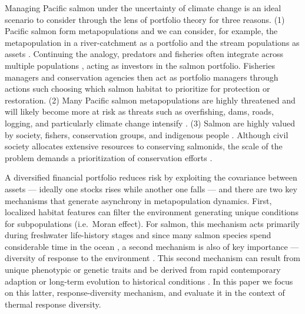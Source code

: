 Managing Pacific salmon under the uncertainty of climate change is an ideal scenario to consider through the lens of portfolio theory for three reasons. (1) Pacific salmon form metapopulations \citep{rieman2000, schtickzelle2007} and we can consider, for example, the metapopulation in a river-catchment as a portfolio and the stream populations as assets \citep{schindler2010, moore2010}. Continuing the analogy, predators and fisheries often integrate across multiple populations \citep{hilborn2003, schindler2008}, acting as investors in the salmon portfolio. Fisheries managers and conservation agencies then act as portfolio managers through actions such choosing which salmon habitat to prioritize for protection or restoration. (2) Many Pacific salmon metapopulations are highly threatened \citep{mcclure2003, gustafson2007, peterman2012} and will likely become more at risk as threats such as overfishing, dams, roads, logging, and particularly climate change intensify \citep[e.g.][]{lackey2003}. (3) Salmon are highly valued by society, fishers, conservation groups, and indigenous people \citep{nrc1996}. Although civil society allocates extensive resources to conserving salmonids, the scale of the problem demands a prioritization of conservation efforts \citep{allendorf1997}.

A diversified financial portfolio reduces risk by exploiting the covariance between assets --- ideally one stocks rises while another one falls --- and there are two key mechanisms that generate asynchrony in metapopulation dynamics. First, localized habitat features can filter the environment generating unique conditions for subpopulations \citep{schindler2008} (i.e.~Moran effect). For salmon, this mechanism acts primarily during freshwater life-history stages and since many salmon species spend considerable time in the ocean \citep{quinn2005}, a second mechanism is also of key importance --- diversity of response to the environment \citetext{\citealp[i.e.~response diversity,][]{elmqvist2003}; \citealp[and biocomplexity][]{colwell1998}; \citealp{hilborn2003}}. This second mechanism can result from unique phenotypic or genetic traits \citep{crozier2008, kovach2012} and be derived from rapid contemporary adaption \citep{stockwell2003, fraser2011} or long-term evolution to historical conditions \citep{eliason2011}. In this paper we focus on this latter, response-diversity mechanism, and evaluate it in the context of thermal response diversity.

